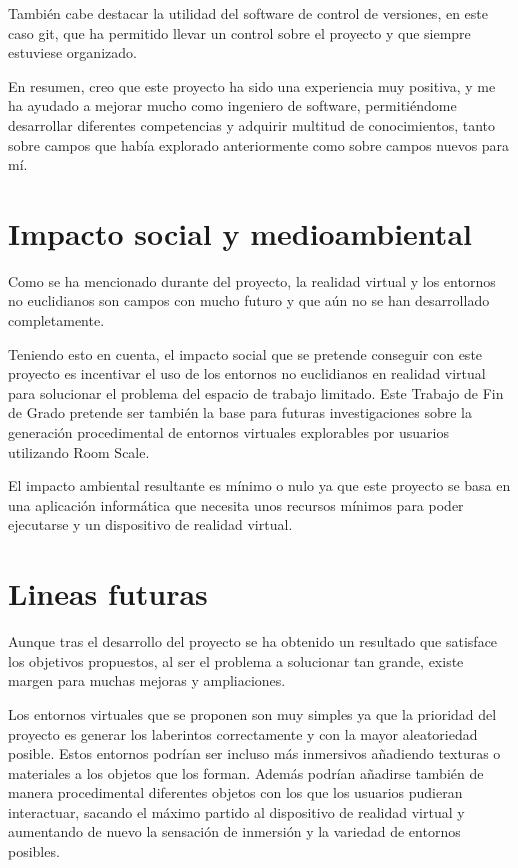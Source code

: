 \documentclass[../main.tex]{subfiles}
\begin{document}
También cabe destacar la utilidad del software de control de versiones, en este caso git, que ha permitido llevar un control sobre el proyecto y que siempre estuviese organizado.

En resumen, creo que este proyecto ha sido una experiencia muy positiva, y me ha ayudado a mejorar mucho como ingeniero de software, permitiéndome desarrollar diferentes competencias y adquirir multitud de conocimientos, tanto sobre campos que había explorado anteriormente como sobre campos nuevos para mí.

\section{Impacto social y medioambiental}

Como se ha mencionado durante del proyecto, la realidad virtual y los entornos no euclidianos son campos con mucho futuro y que aún no se han desarrollado completamente.

Teniendo esto en cuenta, el impacto social que se pretende conseguir con este proyecto es incentivar el uso de los entornos no euclidianos en realidad virtual para solucionar el problema del espacio de trabajo limitado. Este Trabajo de Fin de Grado pretende ser también la base para futuras investigaciones sobre la generación procedimental de entornos virtuales explorables por usuarios utilizando Room Scale.

El impacto ambiental resultante es mínimo o nulo ya que este proyecto se basa en una aplicación informática que necesita unos recursos mínimos para poder ejecutarse y un dispositivo de realidad virtual.

\section{Lineas futuras}

Aunque tras el desarrollo del proyecto se ha obtenido un resultado que satisface los objetivos propuestos, al ser el problema a solucionar tan grande, existe margen para muchas mejoras y ampliaciones.

Los entornos virtuales que se proponen son muy simples ya que la prioridad del proyecto es generar los laberintos correctamente y con la mayor aleatoriedad posible. Estos entornos podrían ser incluso más inmersivos añadiendo texturas o materiales a los objetos que los forman. Además podrían añadirse también de manera procedimental diferentes objetos con los que los usuarios pudieran interactuar, sacando el máximo partido al dispositivo de realidad virtual y aumentando de nuevo la sensación de inmersión y la variedad de entornos posibles.
\end{document}
